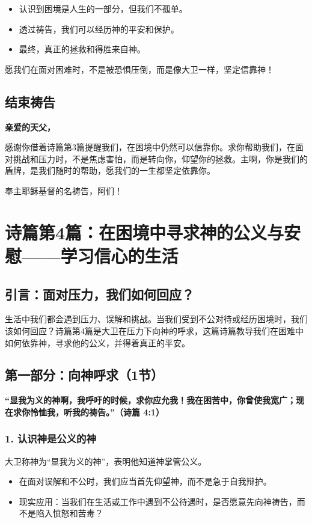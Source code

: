\documentclass[a4paper, 12pt]{article}
\begin{document}
\begin{itemize}
    \item 认识到困境是人生的一部分，但我们不孤单。
    \item 透过祷告，我们可以经历神的平安和保护。
    \item 最终，真正的拯救和得胜来自神。
\end{itemize}

愿我们在面对困难时，不是被恐惧压倒，而是像大卫一样，坚定信靠神！

\subsection*{结束祷告}

\textbf{亲爱的天父，}

感谢你借着诗篇第3篇提醒我们，在困境中仍然可以信靠你。求你帮助我们，在面对挑战和压力时，不是焦虑害怕，而是转向你，仰望你的拯救。主啊，你是我们的盾牌，是我们随时的帮助，愿我们的一生都坚定依靠你。

奉主耶稣基督的名祷告，阿们！

\newpage
\section{诗篇第4篇：在困境中寻求神的公义与安慰——学习信心的生活}
\subsection*{引言：面对压力，我们如何回应？}

生活中我们都会遇到压力、误解和挑战。当我们受到不公对待或经历困境时，我们该如何回应？诗篇第4篇是大卫在压力下向神的呼求，这篇诗篇教导我们在困难中如何依靠神，寻求他的公义，并得着真正的平安。

\subsection*{第一部分：向神呼求（1节）}

\textbf{“显我为义的神啊，我呼吁的时候，求你应允我！我在困苦中，你曾使我宽广；现在求你怜恤我，听我的祷告。”（诗篇 4:1）}

\subsubsection*{1. 认识神是公义的神}
大卫称神为“显我为义的神”，表明他知道神掌管公义。
\begin{itemize}
    \item 在面对误解和不公时，我们应当首先仰望神，而不是急于自我辩护。
    \item 现实应用：当我们在生活或工作中遇到不公待遇时，是否愿意先向神祷告，而不是陷入愤怒和苦毒？
\end{itemize}
\end{document}
